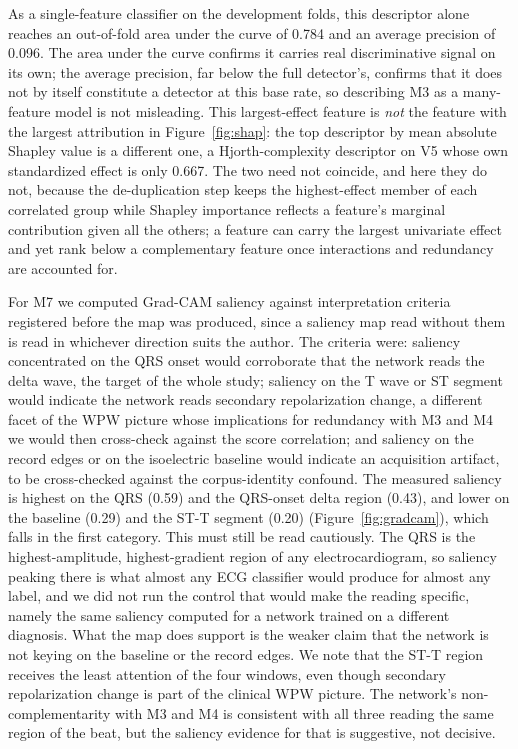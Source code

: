 \documentclass[11pt]{article}
\begin{document}
As a single-feature classifier on the development folds, this descriptor alone reaches an out-of-fold area under the curve of 0.784 and an average precision of 0.096. The area under the curve confirms it carries real discriminative signal on its own; the average precision, far below the full detector's, confirms that it does not by itself constitute a detector at this base rate, so describing M3 as a many-feature model is not misleading. This largest-effect feature is \emph{not} the feature with the largest attribution in Figure~\ref{fig:shap}: the top descriptor by mean absolute Shapley value is a different one, a Hjorth-complexity descriptor on V5 whose own standardized effect is only 0.667. The two need not coincide, and here they do not, because the de-duplication step keeps the highest-effect member of each correlated group while Shapley importance reflects a feature's marginal contribution given all the others; a feature can carry the largest univariate effect and yet rank below a complementary feature once interactions and redundancy are accounted for.

For M7 we computed Grad-CAM saliency against interpretation criteria registered before the map was produced, since a saliency map read without them is read in whichever direction suits the author. The criteria were: saliency concentrated on the QRS onset would corroborate that the network reads the delta wave, the target of the whole study; saliency on the T wave or ST segment would indicate the network reads secondary repolarization change, a different facet of the WPW picture whose implications for redundancy with M3 and M4 we would then cross-check against the score correlation; and saliency on the record edges or on the isoelectric baseline would indicate an acquisition artifact, to be cross-checked against the corpus-identity confound. The measured saliency is highest on the QRS (0.59) and the QRS-onset delta region (0.43), and lower on the baseline (0.29) and the ST-T segment (0.20) (Figure~\ref{fig:gradcam}), which falls in the first category. This must still be read cautiously. The QRS is the highest-amplitude, highest-gradient region of any electrocardiogram, so saliency peaking there is what almost any ECG classifier would produce for almost any label, and we did not run the control that would make the reading specific, namely the same saliency computed for a network trained on a different diagnosis. What the map does support is the weaker claim that the network is not keying on the baseline or the record edges. We note that the ST-T region receives the least attention of the four windows, even though secondary repolarization change is part of the clinical WPW picture. The network's non-complementarity with M3 and M4 is consistent with all three reading the same region of the beat, but the saliency evidence for that is suggestive, not decisive.
\end{document}
